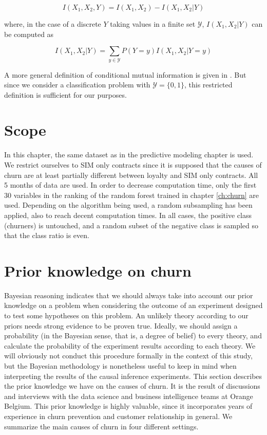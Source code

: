 \begin{equation}
    \label{eq:int_cond}
    I(X_1, X_2, Y) = I(X_1, X_2) - I(X_1, X_2 | Y)
\end{equation}

where, in the case of a discrete $Y$ taking values in a finite set $\mathcal
Y$, $I(X_1, X_2 | Y)$ can be computed as

\begin{equation}
    \label{eq:int_cond_sum}
    I(X_1, X_2 | Y) = \sum_{y\in\mathcal Y}P(Y=y)I(X_1, X_2 | Y = y)
\end{equation}

A more general definition of conditional mutual information is given in
\parencite{cover2012elements}. But since we consider a classification problem
with $\mathcal Y = \{0, 1\}$, this restricted definition is sufficient for our
purposes.

\section{Scope}

In this chapter, the same dataset as in the predictive modeling chapter is used.
We restrict ourselves to SIM only contracts since it is supposed that the causes
of churn are at least partially different between loyalty and SIM only
contracts. All 5 months of data are used. In order to decrease computation time,
only the first 30 variables in the ranking of the random forest trained in
chapter \ref{ch:churn} are used. Depending on the algorithm being used, a random
subsampling has been applied, also to reach decent computation times. In all
cases, the positive class (churners) is untouched, and a random subset of the
negative class is sampled so that the class ratio is even.

\section{Prior knowledge on churn}
\label{sec:causal_prior}

Bayesian reasoning indicates that we should always take into account our prior
knowledge on a problem when considering the outcome of an experiment designed to
test some hypotheses on this problem. An unlikely theory according to our priors
needs strong evidence to be proven true. Ideally, we should assign a probability
(in the Bayesian sense, that is, a degree of belief) to every theory, and
calculate the probability of the experiment results according to each theory. We
will obviously not conduct this procedure formally in the context of this study,
but the Bayesian methodology is nonetheless useful to keep in mind when
interpreting the results of the causal inference experiments. This section
describes the prior knowledge we have on the causes of churn. It is the result
of discussions and interviews with the data science and business intelligence
teams at Orange Belgium. This prior knowledge is highly valuable, since it
incorporates years of experience in churn prevention and customer relationship
in general. We summarize the main causes of churn in four different settings.

